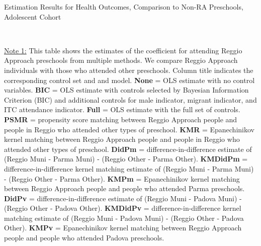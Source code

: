 \begin{table}[H] \caption{Estimation Results for Health Outcomes, Comparison to Non-RA Preschools,  Adolescent Cohort} \label{ols-H-adol-reg-reli}
\scalebox{0.6}{}
\vspace{1ex} \\
\footnotesize\raggedright{\underline{Note 1:} This table shows the estimates of the coefficient for attending Reggio Approach preschools from multiple methods. We compare Reggio Approach individuals with those who attended other preschools. Column title indicates the corresponding control set and and model. \textbf{None} = OLS estimate with no control variables. \textbf{BIC} = OLS estimate with controls selected by Bayesian Information Criterion (BIC) and additional controls for male indicator, migrant indicator, and ITC attendance indicator. \textbf{Full} = OLS estimate with the full set of controls. \textbf{PSMR} =  propensity score matching between Reggio Approach people and people in Reggio who attended other types of preschool. \textbf{KMR} = Epanechinikov kernel matching between Reggio Approach people and people in Reggio who attended other types of preschool. \textbf{DidPm} = difference-in-difference estimate of (Reggio Muni - Parma Muni) - (Reggio Other - Parma Other). \textbf{KMDidPm} = difference-in-difference kernel matching estimate of (Reggio Muni - Parma Muni) - (Reggio Other - Parma Other).   \textbf{KMPm} = Epanechinikov kernel matching between Reggio Approach people and people who attended Parma preschools. \textbf{DidPv} = difference-in-difference estimate of (Reggio Muni - Padova Muni) - (Reggio Other - Padova Other). \textbf{KMDidPv} = difference-in-difference kernel matching estimate of (Reggio Muni - Padova Muni) - (Reggio Other - Padova Other).  \textbf{KMPv} = Epanechinikov kernel matching between Reggio Approach people and people who attended Padova preschools.}
\end{table}


